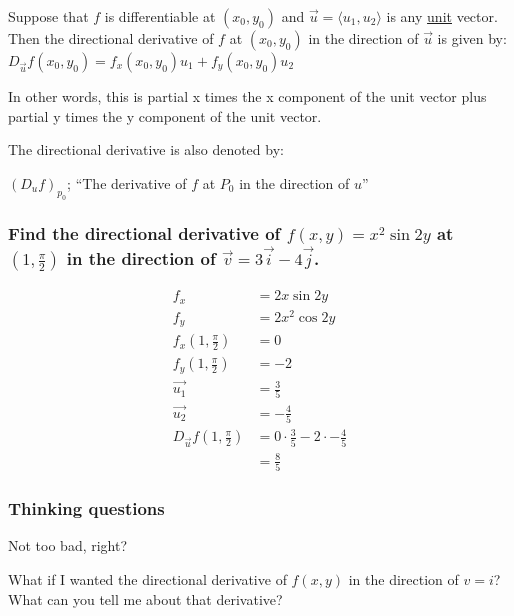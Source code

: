 \documentclass[
  letterpaper,
  DIV=11,
  numbers=noendperiod]{scrartcl}
\begin{document}
Suppose that \(f\) is differentiable at \((x_0, y_0)\) and
\(\vec{u} = \langle u_1, u_2 \rangle\) is any \ul{unit} vector. Then the
directional derivative of \(f\) at \((x_0, y_0)\) in the direction of
\(\vec{u}\) is given by:
\(D_{\vec{u}}f(x_0, y_0) = f_x(x_0, y_0)u_1 + f_y(x_0, y_0)u_2\)

In other words, this is partial x times the x component of the unit
vector plus partial y times the y component of the unit vector.

The directional derivative is also denoted by:

\((D_uf)_{p_0}\); ``The derivative of \(f\) at \(P_0\) in the direction
of \(u\)''

\subsubsection{\texorpdfstring{Find the directional derivative of
\(f(x,y) = x^2\sin 2y\) at \(\left(1, \frac{\pi}{2}\right)\) in the
direction of
\(\vec{v} = 3\vec{i} - 4\vec{j}\).}{Find the directional derivative of f(x,y) = x\^{}2\textbackslash sin 2y at \textbackslash left(1, \textbackslash frac\{\textbackslash pi\}\{2\}\textbackslash right) in the direction of \textbackslash vec\{v\} = 3\textbackslash vec\{i\} - 4\textbackslash vec\{j\}.}}\label{find-the-directional-derivative-of-fxy-x2sin-2y-at-left1-fracpi2right-in-the-direction-of-vecv-3veci---4vecj.}

\begin{align*}
f_x &= 2x\sin 2y \\
f_y &= 2x^2\cos 2y \\
f_x(1, \frac{\pi}{2}) &= 0 \\
f_y(1, \frac{\pi}{2}) &= -2 \\
\vec{u_1} &= \frac{3}{5} \\
\vec{u_2} &= -\frac{4}{5} \\ 
D_{\vec{u}}f(1, \frac{\pi}{2}) &= 0 \cdot \frac{3}{5} - 2 \cdot -\frac{4}{5} \\
&= \frac{8}{5}
\end{align*}

\subsubsection{Thinking questions}\label{thinking-questions}

Not too bad, right?

What if I wanted the directional derivative of \(f(x, y)\) in the
direction of \(v = i\)? What can you tell me about that derivative?
\end{document}
